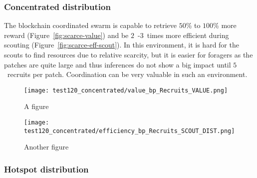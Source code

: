 \documentclass[runningheads]{llncs}
\begin{document}
\subsubsection{Concentrated distribution}

The blockchain coordinated swarm is capable to retrieve $50$\% to $100$\% more reward (Figure~\ref{fig:scarce-value}) and be $2$~-$3$~times more efficient during scouting (Figure~\ref{fig:scarce-eff-scout}). In this environment, it is hard for the scouts to find resources due to relative scarcity, but it is easier for foragers as the patches are quite large and thus inferences do not show a big impact until $5$~recruits per patch. Coordination can be very valuable in such an environment.

\begin{figure}
\centering
\begin{minipage}{.495\textwidth}
  \centering
  \texttt{[image: test120\_concentrated/value\_bp\_Recruits\_VALUE.png]}
  \caption{A figure}
  \label{fig:concentrated-value}
\end{minipage}
\begin{minipage}{.495\textwidth}
  \centering
  \texttt{[image: test120\_concentrated/efficiency\_bp\_Recruits\_SCOUT\_DIST.png]}
  \caption{Another figure}
  \label{fig:concentrated-eff-scout}
\end{minipage}
\end{figure}


\subsubsection{Hotspot distribution}
\end{document}
